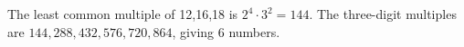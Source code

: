 The least common multiple of 12,16,18 is $2^4\cdot3^2=144$. The three-digit multiples are $144,288,432,576,720,864$, giving $\boxed6$ numbers.
